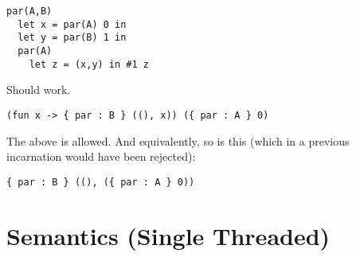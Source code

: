 \documentclass[10pt]{article}
\begin{document}
\begin{verbatim}
par(A,B) 
  let x = par(A) 0 in
  let y = par(B) 1 in
  par(A) 
    let z = (x,y) in #1 z
\end{verbatim}
Should work.

\begin{verbatim}
(fun x -> { par : B } ((), x)) ({ par : A } 0)
\end{verbatim}
The above is allowed. And equivalently, so is this (which in a
previous incarnation would have been rejected):
\begin{verbatim}
{ par : B } ((), ({ par : A } 0))
\end{verbatim}

\section{Semantics (Single Threaded)}
\label{sec:STsemantics}
\end{document}
